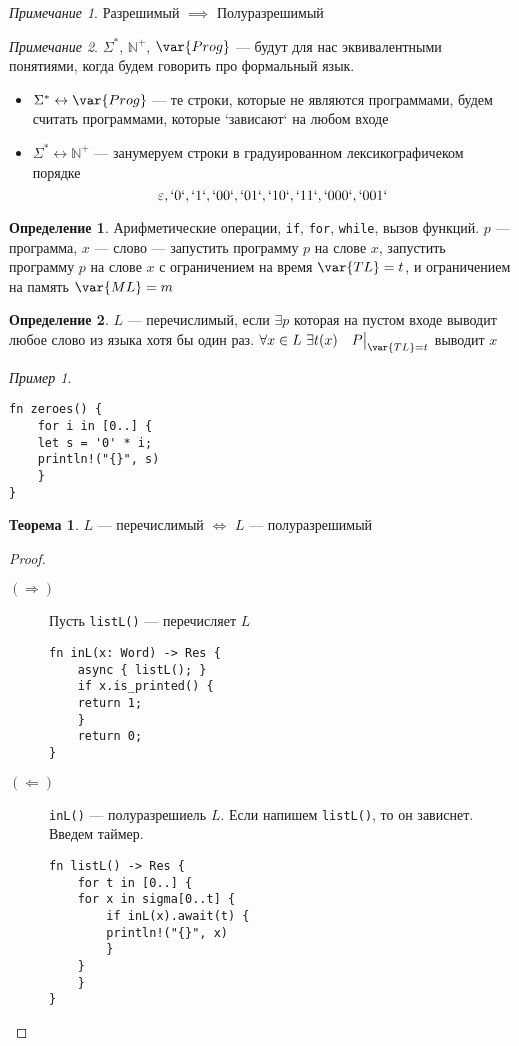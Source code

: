 \documentclass[english]{article}
\newcommand{\N}{\mathbb{N}}
\theoremstyle{plain}
\theoremstyle{remark}
\newtheorem*{remark}{Примечание}
\newtheorem*{examp}{Пример}
\theoremstyle{definition}
\newtheorem{theorem}{Теорема}[section]
\newtheorem*{definition}{Определение}
\begin{document}
\begin{remark}
Разрешимый \(\implies\) Полуразрешимый
\end{remark}
\begin{remark}
\(\Sigma^*\), \(\N^+\), \(\var{Prog}\) --- будут для нас эквивалентными понятиями, когда будем говорить про формальный язык.
\begin{itemize}
\item \(\Sigma^* \leftrightarrow \var{Prog}\) --- те строки, которые не являются программами, будем считать программами, которые `зависают` на любом входе
\item \(\Sigma^* \leftrightarrow \N^+\) --- занумеруем строки в градуированном лексикографичеком порядке \\
\[ \varepsilon, `0`, `1`, `00`, `01`, `10`, `11`, `000`, `001` \]
\end{itemize}
\end{remark}
\begin{definition}
Арифметические операции, \texttt{if}, \texttt{for}, \texttt{while}, вызов функций. \(p\) --- программа, \(x\) --- слово --- запустить программу \(p\) на слове \(x\), запустить программу \(p\) на слове \(x\) с ограничением на время \(\var{TL} = t\), и ограничением на память \(\var{ML} = m\)
\end{definition}
\begin{definition}
\(L\) --- перечислимый, если \(\exists p\) которая на пустом входе выводит любое слово из языка хотя бы один раз. \(\forall x \in L\ \exists t(x)\quad P\big|_{\var{TL} = t}\) выводит \(x\)
\end{definition}
\begin{examp}
\-
\begin{verbatim}
fn zeroes() {
    for i in [0..] {
	let s = '0' * i;
	println!("{}", s)
    }
}
\end{verbatim}
\end{examp}
\begin{theorem}
\(L\) --- перечислимый \(\Leftrightarrow\) \(L\) --- полуразрешимый
\end{theorem}
\begin{proof}
\-
\begin{description}
\item[{\((\Rightarrow)\)}] Пусть \texttt{listL()} --- перечисляет \(L\)
\begin{verbatim}
fn inL(x: Word) -> Res {
    async { listL(); }
    if x.is_printed() {
	return 1;
    }
    return 0;
}
\end{verbatim}
\item[{\((\Leftarrow)\)}] \texttt{inL()} --- полуразрешиель \(L\). Если напишем \texttt{listL()}, то он зависнет. Введем таймер.
\begin{verbatim}
fn listL() -> Res {
    for t in [0..] {
	for x in sigma[0..t] {
	    if inL(x).await(t) {
		println!("{}", x)
	    }
	}
    }
}
\end{verbatim}
\end{description}
\end{proof}
\end{document}
